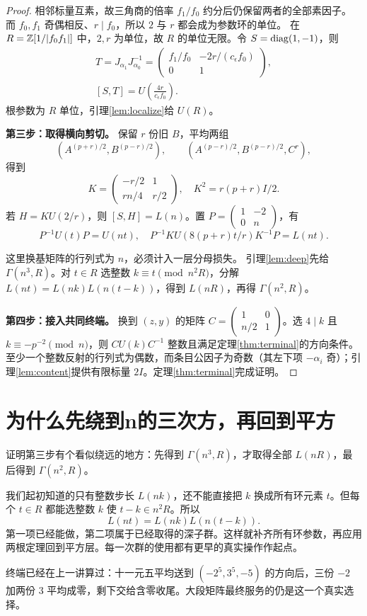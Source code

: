 \begin{proof}
相邻标量互素，故三角商的倍率 $f_1/f_0$ 约分后仍保留两者的全部素因子。
而 $f_0,f_1$ 奇偶相反、$r\mid f_0$，所以 $2$ 与 $r$ 都会成为参数环的单位。
在 $R=\mathbb Z[1/|f_0f_1|]$ 中，$2,r$ 为单位，故 $R$ 的单位无限。令 $S=\operatorname{diag}(1,-1)$，则
\begin{gather*}
T=J_{\alpha_1}J_{\alpha_0}^{-1}
=\begin{pmatrix}f_1/f_0&-2r/(c_\epsilon f_0)\\0&1\end{pmatrix},\\
[S,T]=U\left(\frac{4r}{c_\epsilon f_0}\right).
\end{gather*}
根参数为 $R$ 单位，引理\ref{lem:localize}给 $U(R)$。

\par\noindent\textbf{第三步：取得横向剪切。}
保留 $r$ 份旧 $B$，平均两组
\[
(A^{(p+r)/2},B^{(p-r)/2}),\qquad
(A^{(p-r)/2},B^{(p-r)/2},C^r),
\]
得到
\[
K=\begin{pmatrix}-r/2&1\\rn/4&r/2\end{pmatrix},\quad K^2=r(p+r)I/2.
\]
若 $H=KU(2/r)$，则 $[S,H]=L(n)$。置 $P=\left(\begin{smallmatrix}1&-2\\0&n\end{smallmatrix}\right)$，有
\[
P^{-1}U(t)P=U(nt),\quad
P^{-1}KU(8(p+r)t/r)K^{-1}P=L(nt).
\]

这里换基矩阵的行列式为 $n$，必须计入一层分母损失。
引理\ref{lem:deep}先给 $\Gamma(n^3,R)$。对 $t\in R$ 选整数 $k\equiv t\pmod{n^2R}$，分解 $L(nt)=L(nk)L(n(t-k))$，得到 $L(nR)$，再得 $\Gamma(n^2,R)$。

\par\noindent\textbf{第四步：接入共同终端。}
换到 $(z,y)$ 的矩阵 $C=\left(\begin{smallmatrix}1&0\\n/2&1\end{smallmatrix}\right)$。选 $4\mid k$ 且 $k\equiv-p^{-2}\pmod n$，则 $CU(k)C^{-1}$ 整数且满足定理\ref{thm:terminal}的方向条件。至少一个整数反射的行列式为偶数，而条目公因子为奇数（其左下项 $-\alpha_i$ 奇）；引理\ref{lem:content}提供有限标量 $2I$。定理\ref{thm:terminal}完成证明。
\end{proof}

\section{为什么先绕到n的三次方，再回到平方}
证明第三步有个看似绕远的地方：先得到 $\Gamma(n^3,R)$，才取得全部 $L(nR)$，最后得到 $\Gamma(n^2,R)$。

我们起初知道的只有整数步长 $L(nk)$，还不能直接把 $k$ 换成所有环元素 $t$。但每个 $t\in R$ 都能选整数 $k$ 使 $t-k\in n^2R$。所以
\[L(nt)=L(nk)L(n(t-k)).
\]
第一项已经能做，第二项属于已经取得的深子群。这样就补齐所有环参数，再应用两根定理回到平方层。每一次群的使用都有更早的真实操作作起点。

终端已经在上一讲算过：十一元五平均送到 $(-2^5,3^5,-5)$ 的方向后，三份 $-2$ 加两份 $3$ 平均成零，剩下交给含零收尾。大段矩阵最终服务的仍是这一个真实选择。
